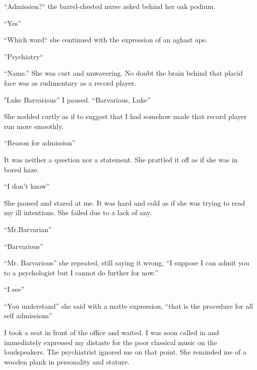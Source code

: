 ``Admission?`` the barrel-chested nurse asked behind her oak
podium.



``Yes''



``Which ward`` she continued with the expression of an aghast
ape.



''Psychiatry``



``Name.'' She was curt and unwavering. No doubt the brain
behind that placid face was as rudimentary as a record
player.



"Luke Barvarious'' I paused. ``Barvarious,
Luke''



She nodded curtly as if to suggest that I had somehow made that
record player run more smoothly.



``Reason for admission''



It was neither a question nor a statement. She prattled it off as
if she was in bored haze.



``I don't know''



She paused and stared at me. It was hard and cold as if she was
trying to read my ill intentions. She failed due to a lack of
any.



``Mr.Barvarian''



``Barvarious''



``Mr. Barvarious'' she repeated, still saying it wrong,
``I suppose I can admit you to a psychologist but I cannot do
further for now.''



``I see''



``You understand'' she said with a matte expression,
``that is the procedure for all self admissions''



I took a seat in front of the office and waited. I was soon called
in and immediately expressed my distaste for the poor classical
music on the loudspeakers. The psychiatrist ignored me on that
point. She reminded me of a wooden plank in personality and
stature.



